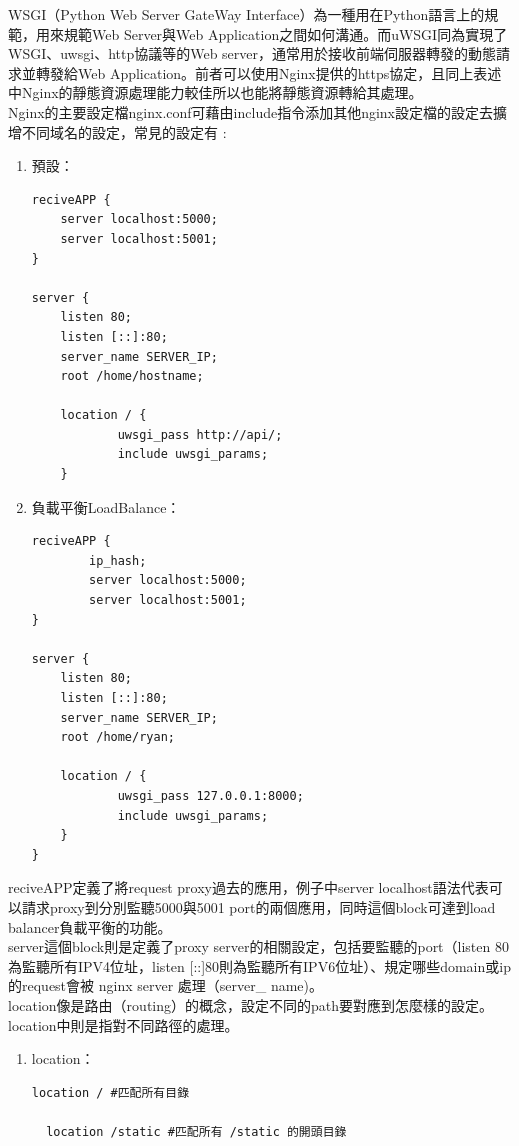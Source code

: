 \documentclass[14pt,a4paper]{report}  %
\begin{document}
 WSGI（Python Web Server GateWay Interface）為一種用在Python語言上的規範，用來規範Web Server與Web Application之間如何溝通。而uWSGI同為實現了WSGI、uwsgi、http協議等的Web server，通常用於接收前端伺服器轉發的動態請求並轉發給Web Application。前者可以使用Nginx提供的https協定，且同上表述中Nginx的靜態資源處理能力較佳所以也能將靜態資源轉給其處理。\\
 
Nginx的主要設定檔nginx.conf可藉由include指令添加其他nginx設定檔的設定去擴增不同域名的設定，常見的設定有 :
\begin{enumerate}
\item 預設：
\begin{lstlisting}[caption=nginx預設]
  reciveAPP {
    server localhost:5000;
    server localhost:5001;
}

server {
    listen 80;
    listen [::]:80;
    server_name SERVER_IP;
    root /home/hostname;

    location / {
            uwsgi_pass http://api/;
            include uwsgi_params;
    }
\end{lstlisting}

\newpage
\item 負載平衡LoadBalance：
\begin{lstlisting}[caption=load balance設定]
  reciveAPP {
        ip_hash;
        server localhost:5000;
        server localhost:5001;
}

server {
    listen 80;
    listen [::]:80;
    server_name SERVER_IP;
    root /home/ryan;

    location / {
            uwsgi_pass 127.0.0.1:8000;
            include uwsgi_params;
    }
}
\end{lstlisting}
\end{enumerate}

 reciveAPP定義了將request proxy過去的應用，例子中server localhost語法代表可以請求proxy到分別監聽5000與5001 port的兩個應用，同時這個block可達到load balancer負載平衡的功能。\\
 
 server這個block則是定義了proxy server的相關設定，包括要監聽的port（listen 80為監聽所有IPV4位址，listen [::]80則為監聽所有IPV6位址）、規定哪些domain或ip的request會被 nginx server 處理（server\_ name)。\\
 
 location像是路由（routing）的概念，設定不同的path要對應到怎麼樣的設定。location中則是指對不同路徑的處理。\\
 
\begin{enumerate}
\item location：
\begin{lstlisting}[caption=location設定]
  location / #匹配所有目錄

  location /static #匹配所有 /static 的開頭目錄
\end{lstlisting}
\end{enumerate}
\end{document}
